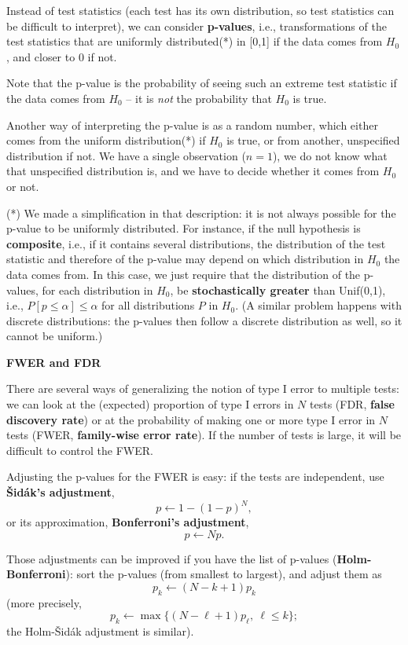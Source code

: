 \documentclass[a5paper]{article}
\let\d\textbf
\let\leq\leqslant
\def\subsection#1{{\par\bigskip\goodbreak\large\bfseries #1\par}}
\begin{document}
Instead of test statistics (each test has its own distribution,
so test statistics can be difficult to interpret), we can consider \d{p-values},
i.e., transformations of the test statistics that are uniformly distributed(*) in [0,1]
if the data comes from $H_0$, and closer to 0 if not.

Note that the p-value is the probability of seeing such an extreme test statistic if the data comes from $H_0$ --
it is \emph{not} the probability that $H_0$ is true.

Another way of interpreting the p-value is as a random number,
which either comes from the uniform distribution(*) if $H_0$ is true,
or from another, unspecified distribution if not.
We have a single observation ($n=1$), we do not know what that unspecified distribution is,
and we have to decide whether it comes from $H_0$ or not.

(*) We made a simplification in that description: it is not always possible for the p-value to be uniformly distributed.
For instance, if  the null hypothesis is \d{composite}, i.e., if it contains several distributions,
the distribution of the test statistic and therefore of the p-value may depend on which distribution in $H_0$ the data comes from.
In this case, we just require that the distribution of the p-values, for each distribution in $H_0$,
be \d{stochastically greater} than Unif(0,1),
i.e., $P[p\leq\alpha]\leq\alpha$ for all distributions $P$ in $H_0$.
(A similar problem happens with discrete distributions:
the p-values then follow a discrete distribution as well, so it cannot be uniform.)

\subsection{FWER and FDR}

There are several ways of generalizing the notion of type I error to multiple tests:
we can look at the (expected) proportion of type I errors in $N$ tests
(FDR, \d{false discovery rate})
or at the probability of making one or more type I error in $N$ tests (FWER, \d{family-wise error rate}).
If the number of tests is large, it will be difficult to control the FWER.

Adjusting the p-values for the FWER is easy:
if the tests are independent, use \d{Šidák's adjustment},
\[ p \leftarrow 1 - (1-p)^N, \]
or its approximation, \d{Bonferroni's adjustment},
\[ p \leftarrow Np. \]

Those adjustments can be improved if you have the list of p-values (\d{Holm-Bonferroni}):
sort the p-values (from smallest to largest),
and adjust them as
\[ p_k \leftarrow (N-k+1) p_k \]
(more precisely, \[ p_k \leftarrow \max \bigl\{ (N-\ell+1) p_\ell , \ \ell \leq k \bigr\}; \]
the Holm-Šidák adjustment is similar).
\end{document}
